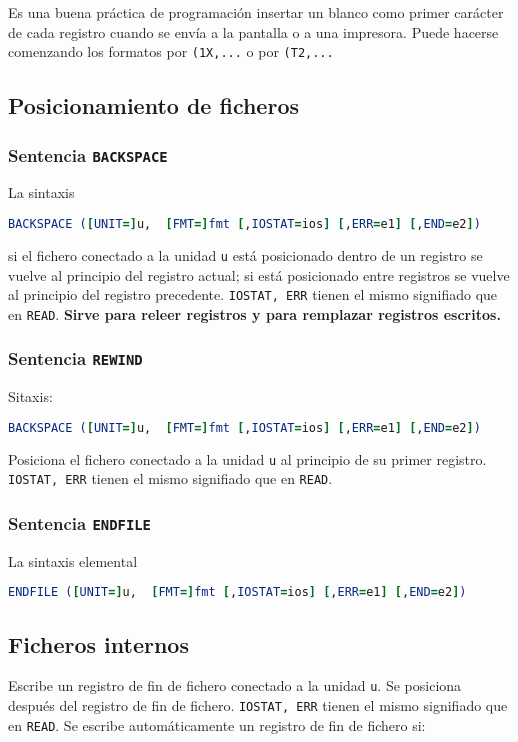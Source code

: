 Es una buena práctica de programación insertar un blanco como primer carácter de cada registro cuando se envía a la pantalla o a una impresora. Puede hacerse comenzando los formatos por {\tt (1X,...} o por {\tt (T2,...}

\subsection{Posicionamiento de ficheros}

\subsubsection{Sentencia {\tt BACKSPACE}}

La sintaxis 

\begin{lstlisting}[language=Fortran]
	BACKSPACE ([UNIT=]u,  [FMT=]fmt [,IOSTAT=ios] [,ERR=e1] [,END=e2])
\end{lstlisting}
si el fichero conectado a la unidad {\tt u} está posicionado dentro de un registro se vuelve al principio del registro actual; si está posicionado entre registros se vuelve al principio del registro precedente. {\tt IOSTAT, ERR} tienen el mismo signifiado que en {\tt READ}. {\bf Sirve para releer registros y para remplazar registros escritos.}

\subsubsection{Sentencia {\tt REWIND}}
Sitaxis:
\begin{lstlisting}[language=Fortran]
	BACKSPACE ([UNIT=]u,  [FMT=]fmt [,IOSTAT=ios] [,ERR=e1] [,END=e2])
\end{lstlisting}
Posiciona el fichero conectado a la unidad {\tt u} al principio de su primer registro. {\tt IOSTAT, ERR} tienen el mismo signifiado que en {\tt READ}. 

\subsubsection{Sentencia {\tt ENDFILE}}
La sintaxis elemental

\begin{lstlisting}[language=Fortran]
	ENDFILE ([UNIT=]u,  [FMT=]fmt [,IOSTAT=ios] [,ERR=e1] [,END=e2])
\end{lstlisting}
\subsection{Ficheros internos}
Escribe un registro de fin de fichero conectado a la unidad {\tt u}. Se posiciona después del registro de fin de fichero. {\tt IOSTAT, ERR} tienen el mismo signifiado que en {\tt READ}. Se escribe automáticamente un registro de fin de fichero si:

